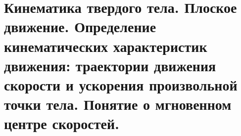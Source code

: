 \chapter{Кинематика твердого тела. Плоское движение. Определение кинематических
характеристик движения: траектории движения скорости и ускорения
произвольной точки тела. Понятие о мгновенном центре скоростей.}

\newpage %
